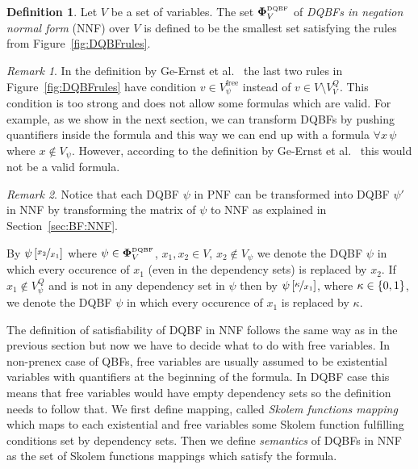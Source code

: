 \documentclass[
  digital, %
  twoside, %
  table,   %
  nolof,     %
  nolot,     %
]{fithesis3}
\let\setbuilder\set
\newcommand{\simpleset}[1]{\{{#1}\}}
\renewcommand{\set}[1]{\normalexpandarg\IfSubStr{#1}{|}{\setbuilder{#1}}{\simpleset{#1}}}
\theoremstyle{definition}
\newtheorem{definition}{Definition}
\theoremstyle{remark}
\newtheorem*{remark}{Remark}
\newcommand{\substitute}[2]{\left[ \nicefrac{#2}{#1} \right]}
\newcommand{\DQBF}[1]{\mathbf{\Phi}_{#1}^{\normalfont{\text{\tiny DQBF}}}}
\newcommand{\fvars}[1]{V_{#1}^{\mathrm{free}}}
\newcommand{\qvars}[1]{V_{#1}^{Q}}
\newcommand{\itholds}{\,}
\begin{document}
\begin{definition}
  Let $V$ be a set of variables. The set $\DQBF{V}$ of \emph{DQBFs in negation normal form} (NNF) over $V$ is defined to be the smallest set satisfying the rules from Figure~\ref{fig:DQBFrules}.
\end{definition}
\begin{remark}
In the definition by Ge-Ernst et al.~\cite{HQSquantifierLocalization} the last two rules in Figure~\ref{fig:DQBFrules} have condition $v \in \fvars{\psi}$ instead of $v \in V \setminus \qvars{V}$. This condition is too strong and does not allow some formulas which are valid. For example, as we show in the next section, we can transform DQBFs by pushing quantifiers inside the formula and this way we can end up with a formula $\forall x \itholds \psi$ where $x \not\in V_{\psi}$. However, according to the definition by Ge-Ernst et al.~\cite{HQSquantifierLocalization} this would not be a valid formula.
\end{remark}

\begin{remark}
Notice that each DQBF $\psi$ in PNF can be transformed into DQBF $\psi'$ in NNF by transforming the matrix of $\psi$ to NNF as explained in Section~\ref{sec:BF:NNF}.
\end{remark}

By $\psi\substitute{x_1}{x_2}$ where $\psi \in \DQBF{V}$, $x_1, x_2 \in V$, $x_2 \not\in V_{\psi}$ we denote the DQBF $\psi$ in which every occurence of $x_1$ (even in the dependency sets) is replaced by $x_2$. If $x_1 \not\in \qvars{\psi}$ and is not in any dependency set in $\psi$ then by $\psi\substitute{x_1}{\kappa}$, where $\kappa\in\set{0,1}$, we denote the DQBF $\psi$ in which every occurence of $x_1$ is replaced by $\kappa$.

The definition of satisfiability of DQBF in NNF follows the same way as in the previous section but now we have to decide what to do with free variables. In non-prenex case of QBFs, free variables are usually assumed to be existential variables with quantifiers at the beginning of the formula. In DQBF case this means that free variables would have empty dependency sets so the definition needs to follow that. We first define mapping, called \emph{Skolem functions mapping} which maps to each existential and free variables some Skolem function fulfilling conditions set by dependency sets. Then we define \emph{semantics} of DQBFs in NNF as the set of Skolem functions mappings which satisfy the formula. %
\end{document}
